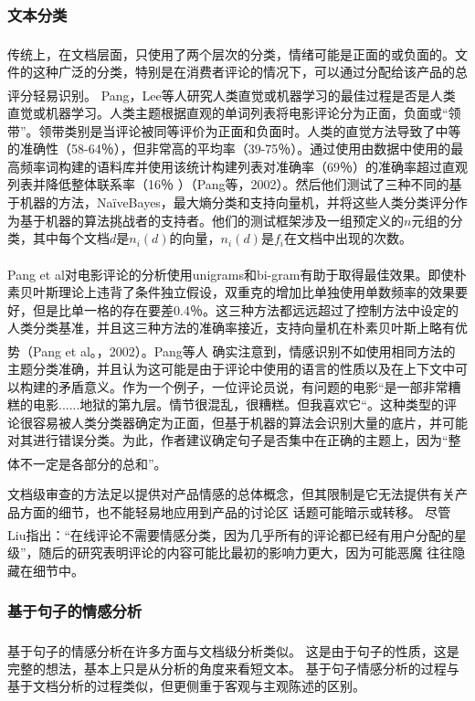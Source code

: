 \documentclass[cs4size,a4paper]{ctexart}
\numberwithin{equation}{section}
\numberwithin{table}{section}
\numberwithin{figure}{section}
\newcommand{\upcite}[1]{\textsuperscript{\textsuperscript{\cite{#1}}}}%
\begin{document}
\subsubsection{文本分类}

传统上，在文档层面，只使用了两个层次的分类，情绪可能是正面的或负面的\upcite{liu2012sentiment}。文件的这种广泛的分类，特别是在消费者评论的情况下，可以通过分配给该产品的总评分轻易识别。
Pang，Lee等人\upcite{pang2002thumbs}研究人类直觉或机器学习的最佳过程是否是人类直觉或机器学习。人类主题根据直观的单词列表将电影评论分为正面，负面或“领带”。领带类别是当评论被同等评价为正面和负面时。人类的直觉方法导致了中等的准确性（58-64％），但非常高的平均率（39-75％）。通过使用由数据中使用的最高频率词构建的语料库并使用该统计构建列表对准确率（69％）的准确率超过直观列表并降低整体联系率（16％ ）（Pang等，2002）。然后他们测试了三种不同的基于机器的方法，NaïveBayes，最大熵分类和支持向量机，并将这些人类分类评分作为基于机器的算法挑战者的支持者。他们的测试框架涉及一组预定义的$n$元组的分类，其中每个文档$d$是$n_i(d)$的向量，$n_i(d)$是$f_i$在文档中出现的次数。

Pang et al\upcite{pang2002thumbs}对电影评论的分析使用unigrams和bi-gram有助于取得最佳效果。即使朴素贝叶斯理论上违背了条件独立假设，双重克的增加比单独使用单数频率的效果要好，但是比单一格的存在要差0.4％。这三种方法都远远超过了控制方法中设定的人类分类基准，并且这三种方法的准确率接近，支持向量机在朴素贝叶斯上略有优势（Pang et al。，2002）。Pang等人\upcite{pang2002thumbs} 确实注意到，情感识别不如使用相同方法的主题分类准确，并且认为这可能是由于评论中使用的语言的性质以及在上下文中可以构建的矛盾意义。作为一个例子，一位评论员说，有问题的电影“是一部非常糟糕的电影......地狱的第九层。情节很混乱，很糟糕。但我喜欢它“。这种类型的评论很容易被人类分类器确定为正面，但基于机器的算法会识别大量的底片，并可能对其进行错误分类。为此，作者建议确定句子是否集中在正确的主题上，因为“整体不一定是各部分的总和”\upcite{pang2002thumbs}。

文档级审查的方法足以提供对产品情感的总体概念，但其限制是它无法提供有关产品方面的细节，也不能轻易地应用到产品的讨论区 话题可能暗示或转移。 尽管Liu\upcite{liu2012sentiment}指出：“在线评论不需要情感分类，因为几乎所有的评论都已经有用户分配的星级”，随后的研究表明评论的内容可能比最初的影响力更大，因为可能恶魔 往往隐藏在细节中。

\subsubsection{基于句子的情感分析}

基于句子的情感分析在许多方面与文档级分析类似\upcite{liu2012sentiment}。 这是由于句子的性质，这是完整的想法，基本上只是从分析的角度来看短文本。 基于句子情感分析的过程与基于文档分析的过程类似，但更侧重于客观与主观陈述的区别。
\end{document}
